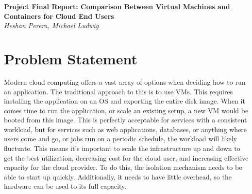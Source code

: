 \documentclass[11pt]{article}
\begin{document}
\renewcommand{\headrulewidth}{0pt} 
\renewcommand{\footrulewidth}{0pt} 
\pagestyle{fancy}
\cfoot{}
\lhead{}
\rhead{}
\lfoot{\itshape\textcolor{gray}{CS525T Cloud Computing Final Report}}

\begin{center}
{\LARGE \bf Project Final Report: Comparison Between Virtual Machines and Containers for Cloud End Users} \\
{\normalsize \emph{Heshan Perera, Michael Ludwig}}\\
\end{center}


\vspace{3mm} %

\section{Problem Statement}

Modern cloud computing offers a vast array of options when deciding how to run an application. The traditional approach to this is to use VMs. This requires installing the application on an OS and exporting the entire disk image. When it comes time to run the application, or scale an existing setup, a new VM would be booted from this image. This is perfectly acceptable for services with a consistent workload, but for services such as web applications, databases, or anything where users come and go, or jobs run on a periodic schedule, the workload will likely fluctuate. This means it's important to scale the infrastructure up and down to get the best utilization, decreasing cost for the cloud user, and increasing effective capacity for the cloud provider. To do this, the isolation mechanism needs to be able to start up quickly. Additionally, it needs to have little overhead, so the hardware can be used to its full capacity.
\end{document}

